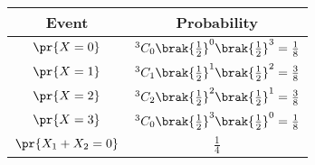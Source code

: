 
\begin{center}
\begin{tabular}{|c|c|}
\hline
\textbf{Event}& \textbf{Probability} \\ \hline
$\pr{X = 0}$ &  ${^{3}C_{0} \brak{\frac{1}{2}}^0 \brak{\frac{1}{2}}^3} = \frac{1}{8}$ \\ \hline
$\pr{X = 1}$ &  ${^{3}C_{1} \brak{\frac{1}{2}}^1 \brak{\frac{1}{2}}^2} = \frac{3}{8}$ \\ \hline
$\pr{X = 2}$ &  ${^{3}C_{2} \brak{\frac{1}{2}}^2 \brak{\frac{1}{2}}^1} = \frac{3}{8}$ \\ \hline
$\pr{X = 3}$ &  ${^{3}C_{0} \brak{\frac{1}{2}}^3 \brak{\frac{1}{2}}^0} =  \frac{1}{8}$ \\ \hline
$\pr{X_1 + X_2 = 0}$ & 	$\frac{1}{4}$ \\ \hline
\end{tabular}
\end{center}
